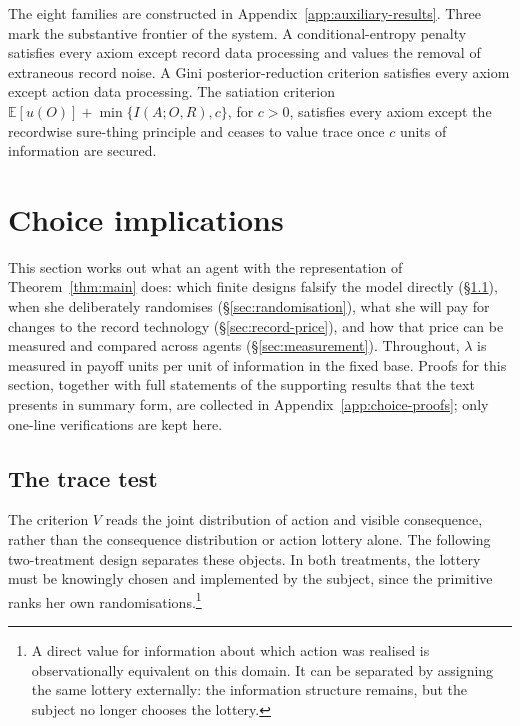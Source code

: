 \documentclass[11pt,a4paper]{article}
\theoremstyle{definition}
\newcommand{\E}{\mathbb E}
\newcommand{\1}{\mathbf 1}
\begin{document}
The eight families are constructed in Appendix~\ref{app:auxiliary-results}.  Three mark the substantive frontier of the
system.  A conditional-entropy penalty satisfies every axiom except record data processing and values the removal of
extraneous record noise.  A Gini posterior-reduction criterion satisfies every axiom except action data processing.
The satiation criterion $\E[u(O)]+\min\{I(A;O,R),c\}$, for $c>0$, satisfies every axiom except the recordwise
sure-thing principle and ceases to value trace once $c$ units of information are secured.

\section{Choice implications}\label{sec:implications}

This section works out what an agent with the representation of Theorem~\ref{thm:main} does: which finite designs
falsify the model directly (\S\ref{sec:tracetest}), when she deliberately randomises (\S\ref{sec:randomisation}),
what she will pay for changes to the record technology (\S\ref{sec:record-price}), and how that price can be
measured and compared across agents (\S\ref{sec:measurement}).
Throughout, $\lambda$ is measured in payoff units per unit of information in the fixed base.  Proofs for this
section, together with full statements of the supporting results that the text presents in summary form, are
collected in Appendix~\ref{app:choice-proofs}; only one-line verifications are kept here.

\subsection{The trace test}\label{sec:tracetest}

The criterion $V$ reads the joint distribution of action and visible consequence, rather than the consequence
distribution or action lottery alone.  The following two-treatment design separates these objects. In both treatments, the lottery must be knowingly chosen and implemented by the subject, since the primitive ranks her own randomisations.\footnote{A direct value for information about which action was realised is observationally equivalent on this domain. It can be separated by assigning the same lottery externally: the information structure remains, but the subject no longer chooses the lottery.}
\end{document}
